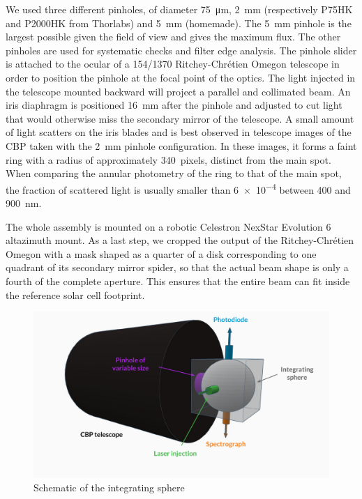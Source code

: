 We used three different pinholes, of diameter \SI{75}{\micro\meter}, \SI{2}{\milli\meter} (respectively P75HK and P2000HK from Thorlabs) and \SI{5}{\milli\meter} (homemade). The \SI{5}{\mm} pinhole is the largest possible given the \SD field of view and gives the maximum flux. The other pinholes are used for systematic checks and filter edge analysis. The pinhole slider is attached to the ocular of a 154/1370 Ritchey-Chrétien Omegon telescope in order to position the pinhole at the focal point of the optics. The light injected in the telescope mounted backward will project a parallel and collimated beam. An iris diaphragm is positioned \SI{16}{mm} after the pinhole and adjusted to cut light that would otherwise miss the secondary mirror of the telescope. A small amount of light scatters on the iris blades and is best observed in telescope images of the CBP taken with the \SI{2}{mm} pinhole configuration. In these images, it forms a faint ring with a radius of approximately \SI{340}{pixels}, distinct from the main spot. When comparing the annular photometry of the ring to that of the main spot, the fraction of scattered light is usually smaller than \num{6e-4} between 400 and \SI{900}{nm}.

The whole assembly is mounted on a robotic Celestron NexStar Evolution 6 altazimuth mount. As a last step, we cropped the output of the Ritchey-Chrétien Omegon with a mask shaped as a quarter of a disk corresponding to one quadrant of its secondary mirror spider, so that the actual beam shape is only a fourth of the complete aperture. This ensures that the entire beam can fit inside the reference solar cell footprint.

\begin{figure}
    \centering
    \includegraphics[width=1\columnwidth]{fig/integrating_sphere_3d.pdf}
    \caption{Schematic of the integrating sphere}
    \label{fig:sphere}
\end{figure}

